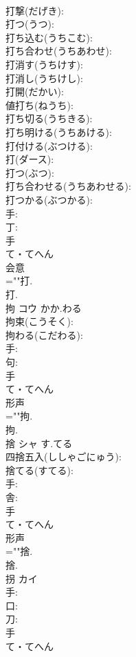 \documentclass[8pt]{extreport}
\begin{document}
\begin{CJK}{UTF8}{min}
\\	打撃(だげき): 
\\	打つ(うつ): 
\\	打ち込む(うちこむ): 
\\	打ち合わせ(うちあわせ): 
\\	打消す(うちけす): 
\\	打消し(うちけし): 
\\	打開(だかい): 
\\	値打ち(ねうち): 
\\	打ち切る(うちきる): 
\\	打ち明ける(うちあける): 
\\	打付ける(ぶつける): 
\\	打(ダース): 
\\	打つ(ぶつ): 
\\	打ち合わせる(うちあわせる): 
\\	打つかる(ぶつかる): 
\\	手: 
\\	丁: 
\\	手	
\\	て・てへん	
\\	会意 
\\	=""打.
\\	打.
\\	拘	コウ	かか.わる		
\\	拘束(こうそく): 
\\	拘わる(こだわる): 
\\	手: 
\\	句: 
\\	手	
\\	て・てへん	
\\	形声 
\\	=""拘.
\\	拘.
\\	捨	シャ	す.てる		
\\	四捨五入(ししゃごにゅう): 
\\	捨てる(すてる): 
\\	手: 
\\	舎: 
\\	手	
\\	て・てへん	
\\	形声 
\\	=""捨.
\\	捨.
\\	拐	カイ			
\\	手: 
\\	口: 
\\	刀: 
\\	手	
\\	て・てへん	

\end{CJK}
\end{document}
